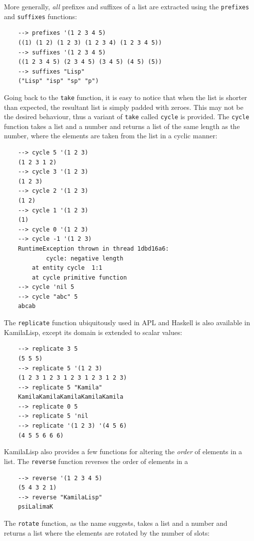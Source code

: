 More generally, \textit{all} prefixes and suffixes of a list are extracted using the \verb|prefixes| and \verb|suffixes| functions:

\begin{Verbatim}
    --> prefixes '(1 2 3 4 5)
    ((1) (1 2) (1 2 3) (1 2 3 4) (1 2 3 4 5))
    --> suffixes '(1 2 3 4 5)
    ((1 2 3 4 5) (2 3 4 5) (3 4 5) (4 5) (5))
    --> suffixes "Lisp"
    ("Lisp" "isp" "sp" "p")
\end{Verbatim}

Going back to the \verb|take| function, it is easy to notice that when the list is shorter than expected, the resultant list is simply padded with zeroes. This may not be the desired behaviour, thus a variant of \verb|take| called \verb|cycle| is provided. The \verb|cycle| function takes a list and a number and returns a list of the same length as the number, where the elements are taken from the list in a cyclic manner:

\begin{Verbatim}
    --> cycle 5 '(1 2 3)
    (1 2 3 1 2)
    --> cycle 3 '(1 2 3)
    (1 2 3)
    --> cycle 2 '(1 2 3)
    (1 2)
    --> cycle 1 '(1 2 3)
    (1)
    --> cycle 0 '(1 2 3)
    --> cycle -1 '(1 2 3)
    RuntimeException thrown in thread 1dbd16a6:
            cycle: negative length
        at entity cycle  1:1
        at cycle primitive function
    --> cycle 'nil 5
    --> cycle "abc" 5
    abcab
\end{Verbatim}

The \verb|replicate| function ubiquitously used in APL and Haskell is also available in KamilaLisp, except its domain is extended to scalar values:

\begin{Verbatim}
    --> replicate 3 5
    (5 5 5)
    --> replicate 5 '(1 2 3)
    (1 2 3 1 2 3 1 2 3 1 2 3 1 2 3)
    --> replicate 5 "Kamila"
    KamilaKamilaKamilaKamilaKamila
    --> replicate 0 5
    --> replicate 5 'nil
    --> replicate '(1 2 3) '(4 5 6)
    (4 5 5 6 6 6)
\end{Verbatim}

KamilaLisp also provides a few functions for altering the \textit{order} of elements in a list. The \verb|reverse| function reverses the order of elements in a 

\begin{Verbatim}
    --> reverse '(1 2 3 4 5)
    (5 4 3 2 1)
    --> reverse "KamilaLisp"
    psiLalimaK
\end{Verbatim}

The \verb|rotate| function, as the name suggests, takes a list and a number and returns a list where the elements are rotated by the number of slots:

